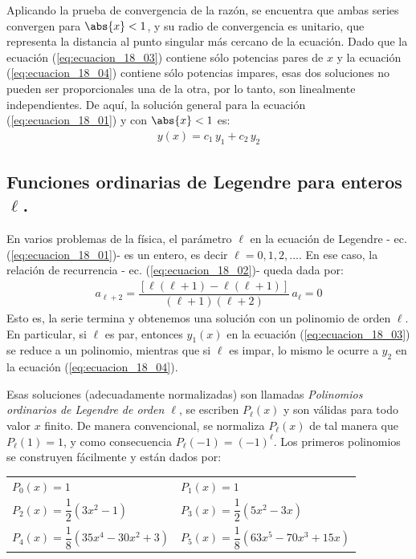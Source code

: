 Aplicando la prueba de convergencia de la razón, se encuentra que ambas series convergen para $\abs{x} < 1$, y su radio de convergencia es unitario, que representa la distancia al punto singular más cercano de la ecuación. Dado que la ecuación (\ref{eq:ecuacion_18_03}) contiene sólo potencias pares de $x$ y la ecuación (\ref{eq:ecuacion_18_04}) contiene sólo potencias impares, esas dos soluciones no pueden ser proporcionales una de la otra, por lo tanto, son linealmente independientes. De aquí, la solución general para la ecuación (\ref{eq:ecuacion_18_01}) y con $\abs{x} < 1$ es:
\begin{align*}
y(x) = c_{1} \, y_{1} + c_{2} \, y_{2}
\end{align*}

\subsection{Funciones ordinarias de Legendre para enteros \texorpdfstring{$\ell$}{l}.}
En varios problemas de la física, el parámetro $\ell$ en la ecuación de Legendre - ec. (\ref{eq:ecuacion_18_01})- es un entero, es decir $\ell = 0,1,2,\ldots$. En ese caso, la relación de recurrencia - ec. (\ref{eq:ecuacion_18_02})- queda dada por:
\begin{align*}
a_{\ell + 2} = \dfrac{[ \ell (\ell + 1) - \ell (\ell + 1) ]}{(\ell + 1)(\ell + 2)} \, a_{\ell} = 0
\end{align*}
Esto es, la serie termina y obtenemos una solución con un polinomio de orden $\ell$. En particular, si $\ell$ es par, entonces $y_{1}(x)$ en la ecuación (\ref{eq:ecuacion_18_03}) se reduce a un polinomio, mientras que si $\ell$ es impar, lo mismo le ocurre a $y_{2}$ en la ecuación (\ref{eq:ecuacion_18_04}).
\par
Esas soluciones (adecuadamente normalizadas) son llamadas \emph{Polinomios ordinarios de Legendre de orden $\ell$}, se escriben $P_{\ell}(x)$ y son válidas para todo valor $x$ finito. De manera convencional, se normaliza $P_{\ell}(x)$ de tal manera que $P_{\ell}(1) =  1$, y como consecuencia $P_{\ell}(-1) = (-1)^{\ell}$. Los primeros polinomios se construyen fácilmente y están dados por:
\begin{center}
\begin{tabular}{l l}
$P_{0}(x) = 1 $ & $P_{1}(x) = 1 $ \\[0.5em]
$P_{2}(x) = \dfrac{1}{2} (3 x^{2} - 1)$ & $P_{3}(x) = \dfrac{1}{2} (5 x^{2} - 3 x)$ \\[0.5em] 
$P_{4}(x) = \dfrac{1}{8} (35 x^{4} - 30 x^{2} + 3)$ & $P_{5}(x) = \dfrac{1}{8} (63 x^{5} - 70 x^{3} + 15 x)$
\end{tabular}
\end{center}

